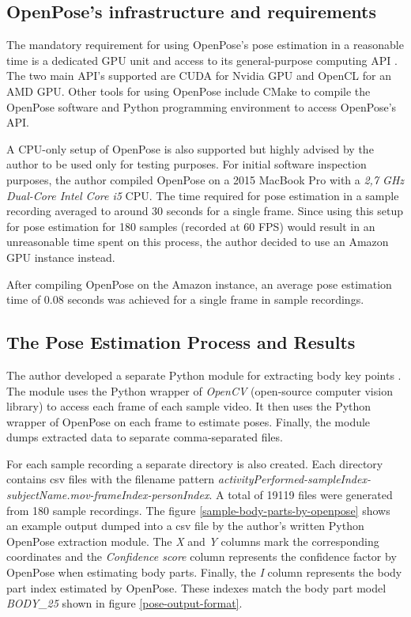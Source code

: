 \subsection{OpenPose's infrastructure and requirements}

The mandatory requirement for using OpenPose's pose estimation in a reasonable time is a dedicated GPU unit and access to its general-purpose computing API \cite{openpose-requirements-and-dependencies}. The two main API's supported are CUDA for Nvidia GPU and OpenCL for an AMD GPU. Other tools for using OpenPose include CMake to compile the OpenPose software and Python programming environment to access OpenPose's API.

A CPU-only setup of OpenPose is also supported but highly advised by the author to be used only for testing purposes. For initial software inspection purposes, the author compiled OpenPose on a 2015 MacBook Pro with a \textit{2,7 GHz Dual-Core Intel Core i5} CPU. The time required for pose estimation in a sample recording averaged to around 30 seconds for a single frame. Since using this setup for pose estimation for 180 samples (recorded at 60 FPS) would result in an unreasonable time spent on this process, the author decided to use an Amazon GPU instance instead.

After compiling OpenPose on the Amazon instance, an average pose estimation time of 0.08 seconds was achieved for a single frame in sample recordings.

\subsection{The Pose Estimation Process and Results}
\label{pose-estimation-process-and-results}

The author developed a separate Python module for extracting body key points \cite{openpose-python-pose-extraction-module}. The module uses the Python wrapper of \textit{OpenCV} (open-source computer vision library) to access each frame of each sample video. It then uses the Python wrapper of OpenPose on each frame to estimate poses. Finally, the module dumps extracted data to separate comma-separated files.

For each sample recording a separate directory is also created. Each directory contains csv files with the filename pattern \textit{activityPerformed-sampleIndex-subjectName.mov-frameIndex-personIndex}. A total of 19119 files were generated from 180 sample recordings. The figure \ref{sample-body-parts-by-openpose} shows an example output dumped into a csv file by the author's written Python OpenPose extraction module. The \textit{X} and \textit{Y} columns mark the corresponding coordinates and the \textit{Confidence score} column represents the confidence factor by OpenPose when estimating body parts. Finally, the \textit{I} column represents the body part index estimated by OpenPose. These indexes match the body part model \textit{BODY\_25} shown in figure \ref{pose-output-format}.

